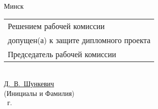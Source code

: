\begin{titlepage}
\begin{center}
    \vfill
    {\normalsize Минск \the\year{}}
  \end{center}

  \newpage
  \thispagestyle{empty}
  \begin{minipage}{\textwidth}
    \vspace{20cm}
    \begin{flushleft}
        \begin{tabular}{@{}l@{}}
            Решением рабочей комиссии\\
            допущен(а) к защите дипломного проекта\\[0.5em]
            Председатель рабочей комиссии
        \end{tabular}\\[0.7em]
        \uline{\hspace{7em}} \uline{Д.~В.~Шункевич\hspace{5em}}\\
        \hspace*{2em}{\footnotesize(Подпись)} \hspace*{1.5em} {\footnotesize(Инициалы и Фамилия)}\\
        \underline{\hspace*{2em}} \underline{\hspace*{6.5em}} \the\year{}~г.
    \end{flushleft}
\end{minipage}\\[1em]
\end{titlepage}
